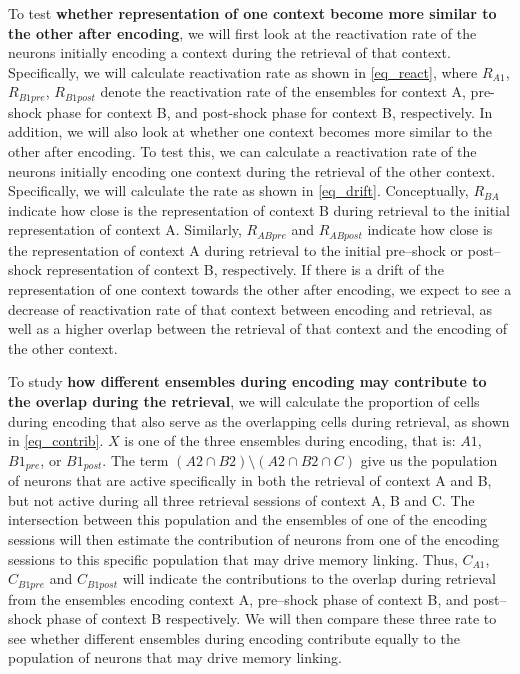 \documentclass[master.tex]{subfiles}
\begin{document}
To test \textbf{whether representation of one context become more similar to the
  other after encoding}, we will first look at the reactivation rate of the
neurons initially encoding a context during the retrieval of that context.
Specifically, we will calculate reactivation rate as shown in
\autoref{eq_react}, where $R_{A1}$, $R_{B1pre}$, $R_{B1post}$ denote the
reactivation rate of the ensembles for context A, pre-shock phase for context B,
and post-shock phase for context B, respectively. In addition, we will also look
at whether one context becomes more similar to the other after encoding. To test
this, we can calculate a reactivation rate of the neurons initially encoding one
context during the retrieval of the other context. Specifically, we will
calculate the rate as shown in \autoref{eq_drift}. Conceptually, $R_{BA}$
indicate how close is the representation of context B during retrieval to the
initial representation of context A. Similarly, $R_{ABpre}$ and $R_{ABpost}$
indicate how close is the representation of context A during retrieval to the
initial pre--shock or post--shock representation of context B, respectively. If
there is a drift of the representation of one context towards the other after
encoding, we expect to see a decrease of reactivation rate of that context
between encoding and retrieval, as well as a higher overlap between the
retrieval of that context and the encoding of the other context.

To study \textbf{how different ensembles during encoding may contribute to the
  overlap during the retrieval}, we will calculate the proportion of cells
during encoding that also serve as the overlapping cells during retrieval, as
shown in \autoref{eq_contrib}. $X$ is one of the three ensembles during
encoding, that is: $A1$, $B1_{pre}$, or $B1_{post}$. The term $(A2 \cap B2)
\setminus (A2 \cap B2 \cap C)$ give us the population of neurons that are active
specifically in both the retrieval of context A and B, but not active during all
three retrieval sessions of context A, B and C. The intersection between this
population and the ensembles of one of the encoding sessions will then estimate
the contribution of neurons from one of the encoding sessions to this specific
population that may drive memory linking. Thus, $C_{A1}$, $C_{B1pre}$ and
$C_{B1post}$ will indicate the contributions to the overlap during retrieval
from the ensembles encoding context A, pre--shock phase of context B, and
post--shock phase of context B respectively. We will then compare these three
rate to see whether different ensembles during encoding contribute equally to
the population of neurons that may drive memory linking.
\end{document}

